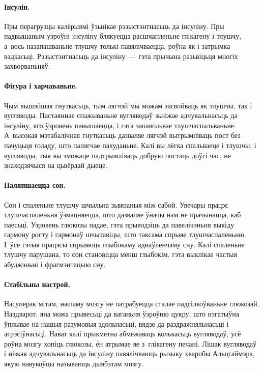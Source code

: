 
\paragraph{Інсулін.}
Пры перагрузцы калёрыямі ўзьнікае рэзыстэнтнасьць да інсуліну. Пры падвышаным узроўні інсуліну блякуецца расшчапленьне глікагену і тлушчу, а~вось назапашваньне тлушчу толькі павялічваецца, роўна як і затрымка вадкасьці. Рэзыстэнтнасьць да інсуліну~--- гэта прычына разьвіцьця многіх захворваньняў.

\paragraph{Фігура і харчаваньне.}
Чым вышэйшая гнуткасьць, тым лягчэй мы можам засвойваць як тлушчы, так і вугляводы. Пастаяннае спажываньне вугляводаў зьніжае адчувальнасьць да інсуліну, яго ўзровень павышаецца, і гэта запавольвае тлушчаспальваньне. А~высокая мэтабалічная гнуткасьць дазваляе лягчэй вытрымліваць пост без пачуцьця голаду, што палягчае пахуданьне. Калі вы лёгка спальваеце і тлушчы, і вугляводы, тыя вы зможаце падтрымліваць добрую постаць доўгі час, не знаходзячыся на цьвёрдай дыеце.

\paragraph{Паляпшаецца сон.}
Сон і спаленьне тлушчу шчыльна зьвязаныя між сабой. Увечары працэс тлушчаспаленьня ўзмацняецца, што дазваляе ўначы нам не прачынацца, каб паесьці. Узровень глюкозы падае, гэта прыводзіць да павелічэньня выкіду гармону росту і гармонаў шчытавіцы, што таксама спрыяе тлушчаспаленьню. І~ўсе гэтыя працэсы спрыяюць глыбокаму аднаўленчаму сну. Калі спаленьне тлушчу парушана, то сон становіцца менш глыбокім, гэта выклікае частыя абуджэньні і фрагмэнтацыю сну.

\paragraph{Стабільны настрой.}
Насуперак мітам, нашаму мозгу не патрабуецца сталае падсілкоўваньне глюкозай. Наадварот, яна можа прывесьці да ваганьня ўзроўню цукру, што нэгатыўна ўплывае на нашыя разумовыя здольнасьці, вядзе да раздражняльнасьці і агрэсіўнасьці. Нават калі прыкметна абмежаваць колькасьць вугляводаў, усё роўна мозгу хопіць глюкозы, ён атрымае яе з~глікагену печані. Лішак вугляводаў і нізкая адчувальнасьць да інсуліну павялічваюць рызыку хваробы Альцгаймэра, якую навукоўцы называюць дыябэтам мозгу.

